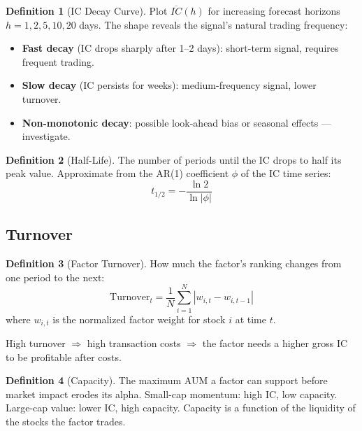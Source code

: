 \documentclass[a4paper, 11pt]{report}
\theoremstyle{definition}
\newtheorem{definition}{Definition}[chapter]
\theoremstyle{remark}
\begin{document}
\begin{definition}[IC Decay Curve]
    Plot $\overline{IC}(h)$ for increasing forecast horizons
    $h = 1, 2, 5, 10, 20$ days.  The shape reveals the signal's natural
    trading frequency:
    \begin{itemize}
        \item \textbf{Fast decay} (IC drops sharply after 1--2 days):
              short-term signal, requires frequent trading.
        \item \textbf{Slow decay} (IC persists for weeks):
              medium-frequency signal, lower turnover.
        \item \textbf{Non-monotonic decay}: possible look-ahead bias or
              seasonal effects --- investigate.
    \end{itemize}
\end{definition}

\begin{definition}[Half-Life]
    The number of periods until the IC drops to half its peak value.
    Approximate from the AR(1) coefficient $\phi$ of the IC time series:
    \[
        t_{1/2} = -\frac{\ln 2}{\ln |\phi|}
    \]
\end{definition}

\subsection{Turnover}

\begin{definition}[Factor Turnover]
    How much the factor's ranking changes from one period to the next:
    \[
        \text{Turnover}_t = \frac{1}{N} \sum_{i=1}^{N}
            |w_{i,t} - w_{i,t-1}|
    \]
    where $w_{i,t}$ is the normalized factor weight for stock $i$ at time $t$.

    High turnover $\Rightarrow$ high transaction costs $\Rightarrow$ the factor
    needs a higher gross IC to be profitable after costs.
\end{definition}

\begin{definition}[Capacity]
    The maximum AUM a factor can support before market impact erodes its alpha.
    Small-cap momentum: high IC, low capacity.  Large-cap value: lower IC,
    high capacity.  Capacity is a function of the liquidity of the stocks the
    factor trades.
\end{definition}

\end{document}
